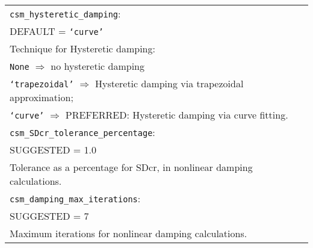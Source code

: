 \documentclass[a4paper, 12pt]{report}
\begin{document}
\begin{tabular}{|p{\textwidth}|}
\hline \vspace{0.1em} \texttt{csm\_hysteretic\_damping}: \\
DEFAULT = \texttt{`curve'} \\
Technique for Hysteretic  damping: \\
 \hspace{0.5em} \texttt{None} $\Rightarrow$ no hysteretic  damping \\
 \hspace{0.5em} \texttt{`trapezoidal'} $\Rightarrow$ Hysteretic  damping via trapezoidal approximation; \\
 \hspace{0.5em} \texttt{`curve'} $\Rightarrow$ \small{PREFERRED}: Hysteretic  damping via curve fitting. \\
\hline \vspace{0.1em} \texttt{csm\_SDcr\_tolerance\_percentage}: \\
SUGGESTED = 1.0 \\
Tolerance as a percentage for SDcr, in nonlinear damping calculations.   \\
\hline \vspace{0.1em} \texttt{csm\_damping\_max\_iterations}: \\
SUGGESTED = 7 \\
 Maximum iterations for nonlinear damping calculations.\\
 \hline
 \end{tabular}
\end{document}
